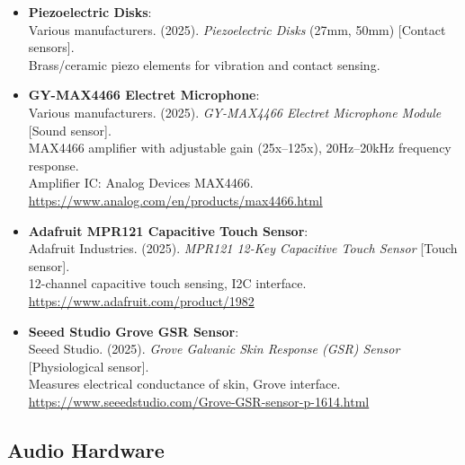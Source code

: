 \begin{itemize}[topsep=0pt, partopsep=0pt, parsep=0pt, itemsep=6pt]
	\item \textbf{Piezoelectric Disks}: \\ 
	Various manufacturers. (2025). \textit{Piezoelectric Disks} (27mm, 50mm) [Contact sensors].\\ 
	Brass/ceramic piezo elements for vibration and contact sensing.
	
	\item \textbf{GY-MAX4466 Electret Microphone}: \\ 
	Various manufacturers. (2025). \textit{GY-MAX4466 Electret Microphone Module} [Sound sensor].\\ 
	MAX4466 amplifier with adjustable gain (25x–125x), 20Hz–20kHz frequency response.\\
	Amplifier IC: Analog Devices MAX4466.\\
	\url{https://www.analog.com/en/products/max4466.html}
	
	\item \textbf{Adafruit MPR121 Capacitive Touch Sensor}: \\ 
	Adafruit Industries. (2025). \textit{MPR121 12-Key Capacitive Touch Sensor} [Touch sensor].\\ 
	12-channel capacitive touch sensing, I2C interface.\\
	\url{https://www.adafruit.com/product/1982}
	
	\item \textbf{Seeed Studio Grove GSR Sensor}: \\ 
	Seeed Studio. (2025). \textit{Grove Galvanic Skin Response (GSR) Sensor} [Physiological sensor].\\ 
	Measures electrical conductance of skin, Grove interface.\\
	\url{https://www.seeedstudio.com/Grove-GSR-sensor-p-1614.html}
\end{itemize}

\subsection*{Audio Hardware}

